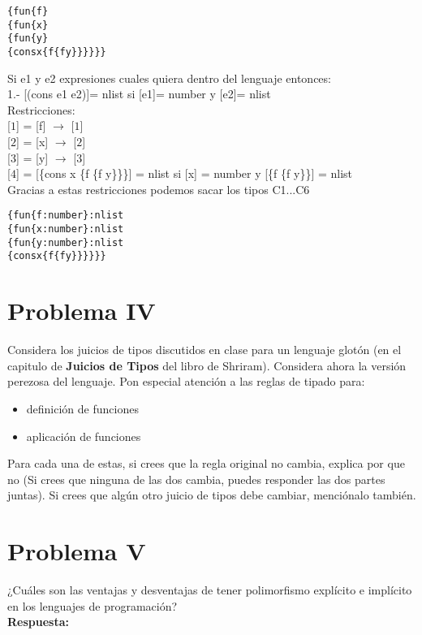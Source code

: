 \documentclass{article}
\begin{document}
\begin{alltt}
\{  fun \{f\}
  \{  fun \{x\}
    \{  fun \{y\}
      \{  cons  x   \{f \{f y\}\}\}\}\}\}
\end{alltt}

Si e1 y e2 expresiones cuales quiera dentro del lenguaje entonces:\\
 1.- [(cons e1 e2)]= nlist si [e1]= number y [e2]= nlist\\

Restricciones:\\

[$\boxed{1}$] = [f] $\rightarrow$ [$\boxed{1}$] \\

[$\boxed{2}$] = [x] $\rightarrow$ [$\boxed{2}$] \\

[$\boxed{3}$] = [y] $\rightarrow$ [$\boxed{3}$] \\

[$\boxed{4}$] = [\{cons x \{f \{f y\}\}\}] = nlist si [x] = number y [\{f \{f y\}\}] = nlist \\


Gracias a estas restricciones podemos sacar los tipos C1...C6
\begin{alltt}
\{fun \{f : number \} : nlist
  \{fun \{x : number \} : nlist
    \{fun \{y : number \} : nlist
      \{cons x \{f \{f y\}\}\}\}\}\}
\end{alltt}


\section*{Problema IV}
Considera los juicios de tipos discutidos en clase para un lenguaje glotón
(en el capitulo de \textbf{Juicios de Tipos} del libro de Shriram).
Considera ahora la versión perezosa del lenguaje. Pon especial atención a
las reglas de tipado para:

\begin{itemize}
\item definición de funciones
\item aplicación de funciones
\end{itemize}

Para cada una de estas, si crees que la regla original no cambia, explica por que no
(Si crees que ninguna de las dos cambia, puedes responder las dos partes juntas).
Si crees que algún otro juicio de tipos debe cambiar, menciónalo también.

\section*{Problema V}
¿Cuáles son las ventajas y desventajas de tener polimorfismo explícito e implícito
en los lenguajes de programación?
\\
\textbf{Respuesta: }
\\
\end{document}
